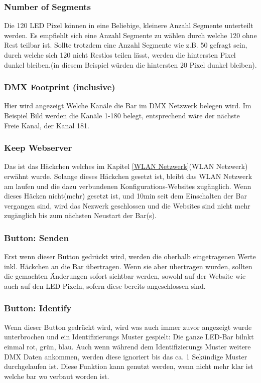 \documentclass{article}
\begin{document}
\subsubsection{Number of Segments}
Die 120 LED Pixel können in eine Beliebige, kleinere Anzahl Segmente unterteilt werden. Es empfiehlt sich eine Anzahl Segmente zu wählen durch welche 120 ohne Rest teilbar ist. Sollte trotzdem eine Anzahl Segmente wie z.B. 50 gefragt sein, durch welche sich 120 nicht Restlos teilen lässt, werden die hintersten Pixel dunkel bleiben.(in diesem Beispiel würden die hintersten 20 Pixel dunkel bleiben).
\subsubsection{DMX Footprint (inclusive)}
Hier wird angezeigt Welche Kanäle die Bar im DMX Netzwerk belegen wird. Im Beispiel Bild werden die Kanäle 1-180 belegt, entsprechend wäre der nächste Freie Kanal, der Kanal 181.
\subsubsection{Keep Webserver}
Das ist das Häckchen welches im Kapitel \ref{WLAN Netzwerk}(WLAN Netzwerk) erwähnt wurde. Solange dieses Häckchen gesetzt ist, bleibt das WLAN Netzwerk am laufen und die dazu verbundenen Konfigurations-Websites zugänglich. Wenn dieses Häcken nicht(mehr) gesetzt ist, und 10min seit dem Einschalten der Bar vergangen sind, wird das Nezwerk geschlossen und die Websites sind nicht mehr zugänglich bis zum nächsten Neustart der Bar(s).
\subsubsection{Button: Senden}
Erst wenn dieser Button gedrückt wird, werden die oberhalb eingetragenen Werte inkl. Häckchen an die Bar übertragen. Wenn sie aber übertragen wurden, sollten die gemachten Änderungen sofort sichtbar werden, sowohl auf der Website wie auch auf den LED Pixeln, sofern diese bereits angeschlossen sind.
\subsubsection{Button: Identify}
Wenn dieser Button gedrückt wird, wird was auch immer zuvor angezeigt wurde unterbrochen und ein Identifizierungs Muster gespielt: Die ganze LED-Bar bilnkt einmal rot, grün, blau. Auch wenn während dem Identifizierungs Muster weitere DMX Daten ankommen, werden diese ignoriert bis das ca. 1 Sekündige Muster durchgelaufen ist. Diese Funktion kann genutzt werden, wenn nicht mehr klar ist welche bar wo verbaut worden ist.
\end{document}
